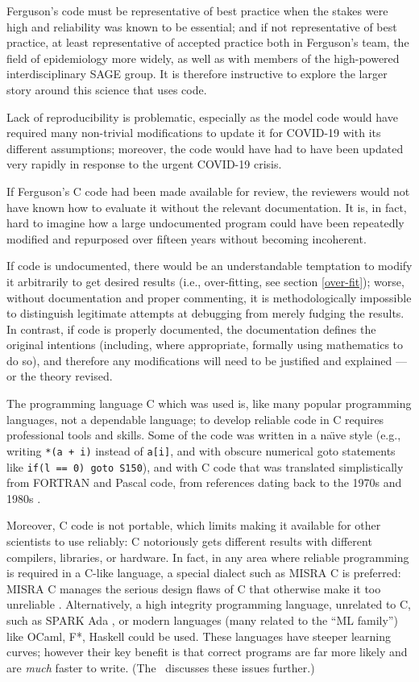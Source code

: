 \documentclass{comjnl}
\begin{document}
Ferguson's code must be representative of best practice when the stakes were high and reliability was known to be essential; and if not representative of best practice, at least representative of accepted practice both in Ferguson's team, the field of epidemiology more widely, as well as with members of the high-powered interdisciplinary SAGE group. It is therefore instructive to explore the larger story around this science that uses code. 

Lack of reproducibility is problematic, especially as the model code would have required many non-trivial modifications to update it for COVID-19 with its different assumptions; moreover, the code would have had to have been updated very rapidly in response to the urgent COVID-19 crisis. 

If Ferguson's C code had been made available for review, the reviewers would not have known how to evaluate it without the relevant documentation. It is, in fact, hard to imagine how a large undocumented program could have been repeatedly modified and repurposed over fifteen years without becoming incoherent. 

If code is undocumented, there would be an understandable temptation to modify it arbitrarily to get desired results (i.e., over-fitting, see section \ref{over-fit}); worse, without documentation and proper commenting, it is methodologically impossible to distinguish legitimate attempts at debugging from merely fudging the results. In contrast, if code is properly documented, the documentation defines the original intentions (including, where appropriate, formally using mathematics to do so), and therefore any modifications will need to be justified and explained --- or the theory revised.

The programming language C which was used \cite{tweet} is, like many popular programming languages, not a dependable language; to develop reliable code in C requires professional tools and skills. Some of the code was written in a na\"\i ve style (e.g., writing \texttt{*(a + i)} instead of \texttt{a[i]}, and with obscure numerical goto statements like \texttt{if(l == 0) goto S150}), and with C code that was translated simplistically from FORTRAN and Pascal code, from references dating back to the 1970s and 1980s .

Moreover, C code is not portable, which limits making it available for other scientists to use reliably: C notoriously gets different results with different compilers, libraries, or hardware. In fact, in any area where reliable programming is required in a C-like language, a special dialect such as MISRA C is preferred: MISRA C manages the serious design flaws of C that otherwise make it too unreliable \cite{misra}. Alternatively, a high integrity programming language, unrelated to C, such as SPARK Ada \cite{spark}, or modern languages (many related to the ``ML family'') like OCaml, F*, Haskell \cite{haskell} could be used. These languages have steeper learning curves; however their key benefit is that correct programs are far more likely and are \emph{much\/} faster to write. (The \supplement\ discusses these issues further.) 
\end{document}
